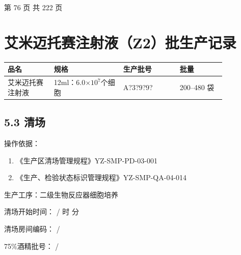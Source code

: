 \documentclass[UTF8,10pt,a4paper,fontset=fandol]{ctexart}
\newcommand{\fieldvalue}[1]{#1}
\newcommand{\handwritten}[1]{#1}
\begin{document}
\begin{center}
第 76 页 共 222 页
\end{center}

\newpage

\section*{艾米迈托赛注射液（Z2）批生产记录}

\begin{tabular}{|p{0.18\linewidth}|p{0.27\linewidth}|p{0.22\linewidth}|p{0.18\linewidth}|}
\hline
品名 & 规格 & 生产批号 & 批量 \\
\hline
\fieldvalue{艾米迈托赛注射液}
&
\fieldvalue{12ml：6.0$\times 10^{7}$个细胞}
&
\fieldvalue{\handwritten{A?3?9?9?}}
&
\fieldvalue{200--480 袋}
\\
\hline
\end{tabular}

\subsection*{5.3 清场}

操作依据：

\begin{enumerate}
    \item 《生产区清场管理规程》\hfill YZ-SMP-PD-03-001
    \item 《生产、检验状态标识管理规程》\hfill YZ-SMP-QA-04-014
\end{enumerate}

生产工序：\fieldvalue{二级生物反应器细胞培养}

清场开始时间：
\fieldvalue{\handwritten{/}} 时 \underline{\hspace{1.2em}} 分

清场房间编码：
\fieldvalue{\handwritten{/}}

75\%酒精批号：
\fieldvalue{\handwritten{/}}
\end{document}
